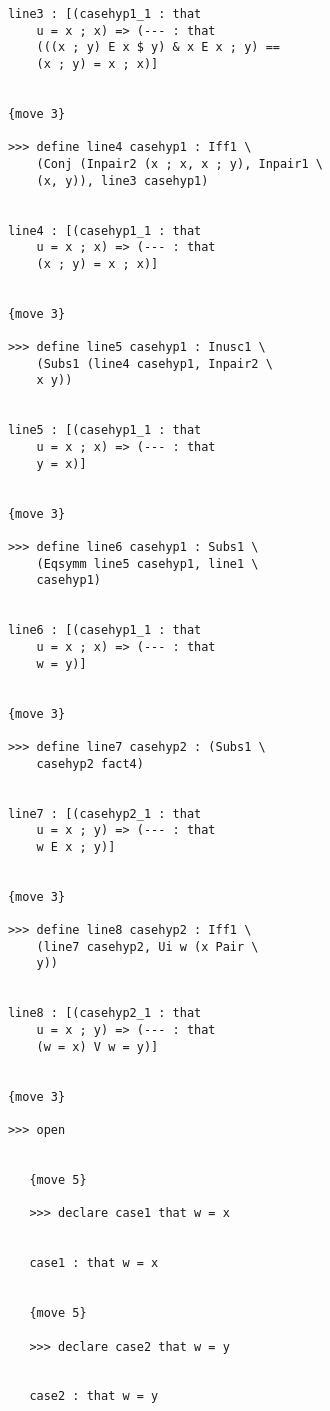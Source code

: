 \documentclass[12pt]{article}
\begin{document}
\begin{verbatim}
            line3 : [(casehyp1_1 : that 
                u = x ; x) => (--- : that 
                (((x ; y) E x $ y) & x E x ; y) == 
                (x ; y) = x ; x)]


            {move 3}

            >>> define line4 casehyp1 : Iff1 \
                (Conj (Inpair2 (x ; x, x ; y), Inpair1 \
                (x, y)), line3 casehyp1)


            line4 : [(casehyp1_1 : that 
                u = x ; x) => (--- : that 
                (x ; y) = x ; x)]


            {move 3}

            >>> define line5 casehyp1 : Inusc1 \
                (Subs1 (line4 casehyp1, Inpair2 \
                x y))


            line5 : [(casehyp1_1 : that 
                u = x ; x) => (--- : that 
                y = x)]


            {move 3}

            >>> define line6 casehyp1 : Subs1 \
                (Eqsymm line5 casehyp1, line1 \
                casehyp1)


            line6 : [(casehyp1_1 : that 
                u = x ; x) => (--- : that 
                w = y)]


            {move 3}

            >>> define line7 casehyp2 : (Subs1 \
                casehyp2 fact4)


            line7 : [(casehyp2_1 : that 
                u = x ; y) => (--- : that 
                w E x ; y)]


            {move 3}

            >>> define line8 casehyp2 : Iff1 \
                (line7 casehyp2, Ui w (x Pair \
                y))


            line8 : [(casehyp2_1 : that 
                u = x ; y) => (--- : that 
                (w = x) V w = y)]


            {move 3}

            >>> open


               {move 5}

               >>> declare case1 that w = x


               case1 : that w = x


               {move 5}

               >>> declare case2 that w = y


               case2 : that w = y



\end{verbatim}
\end{document}
